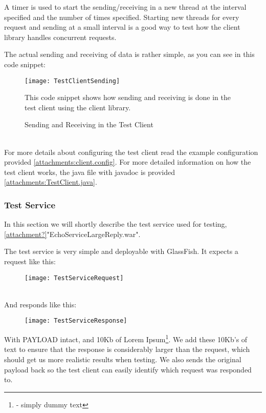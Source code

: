             A timer is used to start the sending/receiving in a new thread at the interval specified and the number of times specified. Starting new threads for every request and sending at a small interval is a good way to test how the client library handles concurrent requests.

            The actual sending and receiving of data is rather simple, as you can see in this code snippet:
            \begin{figure}[h]
                \centering
                \texttt{[image: TestClientSending]}
                \caption{Sending and Receiving in the Test Client}
                This code snippet shows how sending and receiving is done in the test client using the client library.
                \label{fig:TestClientSending}
            \end{figure}
            \\
            For more details about configuring the test client read the example configuration provided \ref{attachments:client.config}. For more detailed information on how the test client works, the java file with javadoc is provided \ref{attachments:TestClient.java}.

        \subsubsection{Test Service}\label{Testing:About:Service}
            In this section we will shortly describe the test service used for testing, \ref{attachment?}"EchoServiceLargeReply.war".

            The test service is very simple and deployable with GlassFish. It expects a request like this:
            \begin{figure}[h]
                \centering
                \texttt{[image: TestServiceRequest]}
                \label{fig:TestServiceRequest}
            \end{figure}
            \\
            And responds like this:
            \begin{figure}[h]
                \centering
                \texttt{[image: TestServiceResponse]}
                \label{fig:TestServiceResponse}
            \end{figure}
            With PAYLOAD intact, and 10Kb of Lorem Ipsum\footnote{ - simply dummy text}. We add these 10Kb's of text to ensure that the response is considerably larger than the request, which should get us more realistic results when testing. We also sends the original payload back so the test client can easily identify which request was responded to.
            
